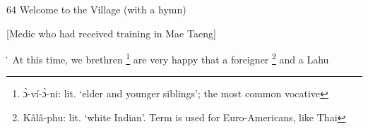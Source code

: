 
64 Welcome to the Village (with a hymn)

[Medic who had received training in Mae Taeng]

\. At this time, we brethren \footnote{ɔ̀-ví-ɔ̀-ni: lit. `elder and younger siblings'; the most common vocative} are very happy that a foreigner \footnote{Kâlâ-phu: lit. `white Indian'. Term is used for Euro-Americans, like Thai} and a Lahu
